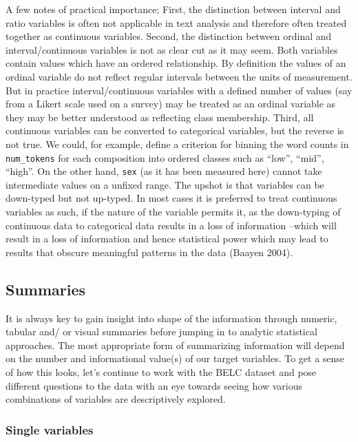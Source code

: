 \documentclass[
  letterpaper,
]{latex/krantz}
\begin{document}
A few notes of practical importance; First, the distinction between
interval and ratio variables is often not applicable in text analysis
and therefore often treated together as continuous variables. Second,
the distinction between ordinal and interval/continuous variables is not
as clear cut as it may seem. Both variables contain values which have an
ordered relationship. By definition the values of an ordinal variable do
not reflect regular intervals between the units of measurement. But in
practice interval/continuous variables with a defined number of values
(say from a Likert scale used on a survey) may be treated as an ordinal
variable as they may be better understood as reflecting class
membership. Third, all continuous variables can be converted to
categorical variables, but the reverse is not true. We could, for
example, define a criterion for binning the word counts in
\texttt{num\_tokens} for each composition into ordered classes such as
``low'', ``mid'', ``high''. On the other hand, \texttt{sex} (as it has
been measured here) cannot take intermediate values on a unfixed range.
The upshot is that variables can be down-typed but not up-typed. In most
cases it is preferred to treat continuous variables as such, if the
nature of the variable permits it, as the down-typing of continuous data
to categorical data results in a loss of information --which will result
in a loss of information and hence statistical power which may lead to
results that obscure meaningful patterns in the data (Baayen 2004).

\hypertarget{summaries}{%
\subsection{Summaries}\label{summaries}}

It is always key to gain insight into shape of the information through
numeric, tabular and/ or visual summaries before jumping in to analytic
statistical approaches. The most appropriate form of summarizing
information will depend on the number and informational value(s) of our
target variables. To get a sense of how this looks, let's continue to
work with the BELC dataset and pose different questions to the data with
an eye towards seeing how various combinations of variables are
descriptively explored.

\hypertarget{single-variables}{%
\subsubsection{Single variables}\label{single-variables}}
\end{document}
